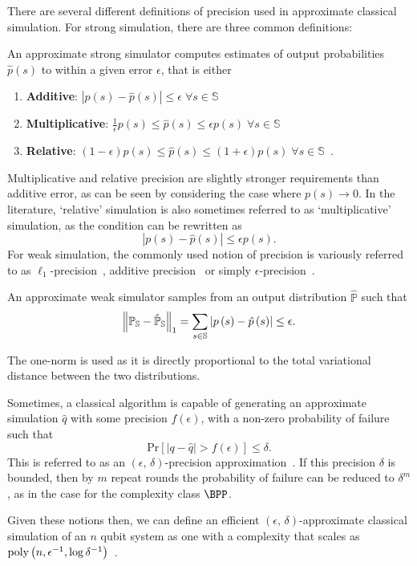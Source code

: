 There are several different definitions of precision used in approximate classical simulation. For strong simulation, there are three common definitions:
\begin{defn}\label{def:approximate_strong}
An approximate strong simulator computes estimates of output probabilities $\hat{p}\left(s\right)$ to within a given error $\epsilon$, that is either
\begin{enumerate}
    \item \textbf{Additive}: $\left|p\left(s\right)-\hat{p}\left(s\right)\right| \leq \epsilon\;\forall s\in\mathbb{S}$~\cite{Pashayan2017}
    \item \textbf{Multiplicative}: $\frac{1}{\epsilon}p\left(s\right)\leq \hat{p}\left(s\right) \leq \epsilon p\left(s\right)\;\forall s\in\mathbb{S}$~\cite{Hangleiter2017}
    \item \textbf{Relative}: $\left(1-\epsilon\right)p\left(s\right) \leq \hat{p}\left(s\right) \leq \left(1+\epsilon\right)p\left(s\right) \;\forall s\in\mathbb{S} $~\cite{Bravyi2016,Hangleiter2017}.
\end{enumerate}
\end{defn}
Multiplicative and relative precision are slightly stronger requirements than additive error, as can be seen by considering the case where $p\left(s\right)\rightarrow 0$. In the literature, `relative' simulation is also sometimes referred to as `multiplicative' simulation, as the condition can be rewritten as~\cite{Pashayan2017}
\[\left|p\left(s\right)-\hat{p}\left(s\right)\right| \leq \epsilon p\left(s\right).\]
For weak simulation, the commonly used notion of precision is variously referred to as $\ell_{1}$-precision~\cite{Bremner2011}, additive precision~\cite{Yoganathan2019} or simply $\epsilon$-precision~\cite{Pashayan2017}.
\begin{defn}\label{def:approximate_weak}
An approximate weak simulator samples from an output distribution $\hat{\mathbb{P}}$ such that
\[ \norm{\mathbb{P}_{\mathbb{S}}-\hat{\mathbb{P}}_{\mathbb{S}}}_{1} = \sum_{s\in \mathbb{S}} \left| p\left(s\right) - \hat{p}\left(s\right)\right| \leq \epsilon.\]
\end{defn}
The one-norm is used as it is directly proportional to the total variational distance between the two distributions.\par
Sometimes, a classical algorithm is capable of generating an approximate simulation $\hat{q}$ with some precision $f\left(\epsilon\right)$, with a non-zero probability of failure such that
\[\text{Pr}\left[\left|q-\hat{q}\right| > f\left(\epsilon\right)\right]\leq \delta.\]
This is referred to as an $\left(\epsilon,\,\delta\right)$-precision approximation~\cite{Pashayan2017}. If this precision $\delta$ is bounded, then by $m$ repeat rounds the probability of failure can be reduced to $\delta^{m}$, as in the case for the complexity class $\BPP$.\par
Given these notions then, we can define an efficient $\left(\epsilon,\,\delta\right)$-approximate classical simulation of an $n$ qubit system as one with a complexity that scales as $\text{poly} \left(n, \epsilon^{-1}, \log{\delta^{-1}}\right)$~\cite{Pashayan2017}.
